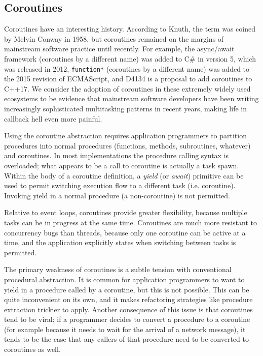 \documentclass[10pt,preprint]{sigplanconf}
\begin{document}
\subsection{Coroutines}

Coroutines have an interesting history.
According to Knuth, the term was coined by Melvin Conway in 1958, but coroutines remained on the margins of mainstream software practice until recently.
For example, the async/await framework (coroutines by a different name) was added to C\# in version 5, which was released in 2012, \texttt{function*} (coroutines by a different name) was added to the 2015 revision of ECMAScript, and D4134 is a proposal to add coroutines to C++17.
We consider the adoption of coroutines in these extremely widely used ecosystems to be evidence that mainstream software developers have been writing increasingly sophisticated multitasking patterns in recent years, making life in callback hell even more painful.

Using the coroutine abstraction requires application programmers to partition procedures into normal procedures (functions, methods, subroutines, whatever) and coroutines.
In most implementations the procedure calling syntax is overloaded; what appears to be a call to coroutine is actually a task spawn.
Within the body of a coroutine definition, a \emph{yield} (or \emph{await}) primitive can be used to permit switching execution flow to a different task (i.e. coroutine).
Invoking yield in a normal procedure (a non-coroutine) is not permitted.

Relative to event loops, coroutines provide greater flexibility, because multiple tasks can be in progress at the same time.
Coroutines are much more resistant to concurrency bugs than threads, because only one coroutine can be active at a time, and the application explicitly states when switching between tasks is permitted.

The primary weakness of coroutines is a subtle tension with conventional procedural abstraction.
It is common for application programmers to want to yield in a procedure called by a coroutine, but this is not possible.
This can be quite inconvenient on its own, and it makes refactoring strategies like procedure extraction trickier to apply.
Another consequence of this issue is that coroutines tend to be viral; if a programmer decides to convert a procedure to a coroutine (for example because it needs to wait for the arrival of a network message), it tends to be the case that any callers of that procedure need to be converted to coroutines as well.
\end{document}
